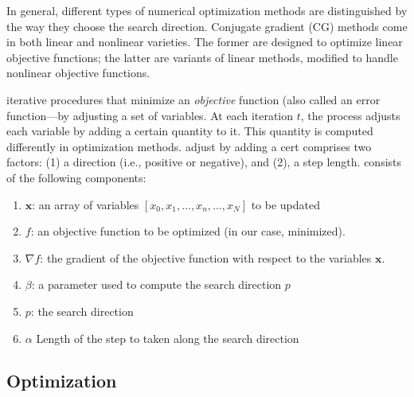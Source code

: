 In general, different types of numerical optimization methods are distinguished 
by the way they choose the search direction.
Conjugate gradient (CG) methods come 
in both linear and nonlinear varieties. The former are designed to optimize 
linear objective functions; the latter are variants of linear methods, modified 
to handle nonlinear objective functions. 



 iterative procedures that minimize an \emph{objective} function (also called an error function---by adjusting a set of variables. At each iteration $t$, the process adjusts each variable by adding a certain quantity to it. This quantity is computed differently in optimization methods. adjust by adding a cert comprises two factors: (1) a direction (i.e., positive or negative), and (2), a step length. consists of the following components:
\begin{enumerate}
\item $\mathbf{x}$: an array of variables $[x_0, x_1, ..., x_n, ..., x_N]$ to be updated
\item $f$: an objective function to be optimized (in our case, minimized).
\item $\nabla f$: the gradient of the objective function with respect to the variables $\mathbf{x}$.
\item $\beta$: a parameter used to compute the search direction $p$
\item $p$: the search direction
\item $\alpha$ Length of the step to taken along the search direction
\end{enumerate}

\subsection{Optimization}
%
%

\cite{cheng-and-li:2012}
%



